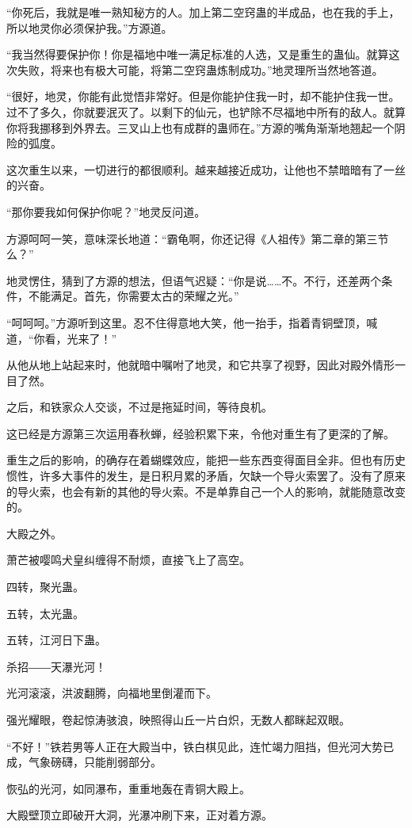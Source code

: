 \begin{this_body}
“你死后，我就是唯一熟知秘方的人。加上第二空窍蛊的半成品，也在我的手上，所以地灵你必须保护我。”方源道。

“我当然得要保护你！你是福地中唯一满足标准的人选，又是重生的蛊仙。就算这次失败，将来也有极大可能，将第二空窍蛊炼制成功。”地灵理所当然地答道。

“很好，地灵，你能有此觉悟非常好。但是你能护住我一时，却不能护住我一世。过不了多久，你就要泯灭了。以剩下的仙元，也铲除不尽福地中所有的敌人。就算你将我挪移到外界去。三叉山上也有成群的蛊师在。”方源的嘴角渐渐地翘起一个阴险的弧度。

这次重生以来，一切进行的都很顺利。越来越接近成功，让他也不禁暗暗有了一丝的兴奋。

“那你要我如何保护你呢？”地灵反问道。

方源呵呵一笑，意味深长地道：“霸龟啊，你还记得《人祖传》第二章的第三节么？”

地灵愣住，猜到了方源的想法，但语气迟疑：“你是说……不。不行，还差两个条件，不能满足。首先，你需要太古的荣耀之光。”

“呵呵呵。”方源听到这里。忍不住得意地大笑，他一抬手，指着青铜壁顶，喊道，“你看，光来了！”

从他从地上站起来时，他就暗中嘱咐了地灵，和它共享了视野，因此对殿外情形一目了然。

之后，和铁家众人交谈，不过是拖延时间，等待良机。

这已经是方源第三次运用春秋蝉，经验积累下来，令他对重生有了更深的了解。

重生之后的影响，的确存在着蝴蝶效应，能把一些东西变得面目全非。但也有历史惯性，许多大事件的发生，是日积月累的矛盾，欠缺一个导火索罢了。没有了原来的导火索，也会有新的其他的导火索。不是单靠自己一个人的影响，就能随意改变的。

大殿之外。

萧芒被嘤鸣犬皇纠缠得不耐烦，直接飞上了高空。

四转，聚光蛊。

五转，太光蛊。

五转，江河日下蛊。

杀招――天瀑光河！

光河滚滚，洪波翻腾，向福地里倒灌而下。

强光耀眼，卷起惊涛骇浪，映照得山丘一片白炽，无数人都眯起双眼。

“不好！”铁若男等人正在大殿当中，铁白棋见此，连忙竭力阻挡，但光河大势已成，气象磅礴，只能削弱部分。

恢弘的光河，如同瀑布，重重地轰在青铜大殿上。

大殿壁顶立即破开大洞，光瀑冲刷下来，正对着方源。


\end{this_body}
